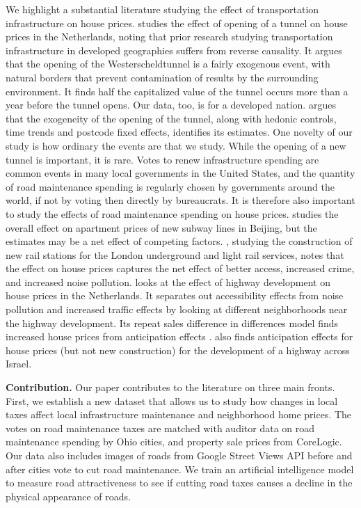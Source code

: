 We highlight a substantial literature studying the effect of transportation infrastructure on house prices. \cite{hoogendoorn2019house} studies the effect of opening of a tunnel on house prices in the Netherlands, noting that prior research studying transportation infrastructure in developed geographies suffers from reverse causality.  It argues that the opening of the Westerscheldtunnel is a fairly exogenous event, with natural borders that prevent contamination of results by the surrounding environment.  It finds half the capitalized value of the tunnel occurs more than a year before the tunnel opens.  Our data, too, is for a developed nation. \cite{hoogendoorn2019house} argues that the exogeneity of the opening of the tunnel, along with hedonic controls, time trends and postcode fixed effects, identifies its estimates.  One novelty of our study is how ordinary the events are that we study.  While the opening of a new tunnel is important, it is rare.  Votes to renew infrastructure spending are common events in many local governments in the United States, and the quantity of road maintenance spending is regularly chosen by governments around the world, if not by voting then directly by bureaucrats.  It is therefore also important to study the effects of road maintenance spending on house prices. \cite{li2016wheels} studies the overall effect on apartment prices of new subway lines in Beijing, but the estimates may be a net effect of competing factors. \cite{gibbons2005valuing}, studying the construction of new rail stations for the London underground and light rail services, notes that the effect on house prices captures the net effect of better access, increased crime, and increased noise pollution. \cite{levkovich2016effects} looks at the effect of highway development on house prices in the Netherlands.  It separates out accessibility effects from noise pollution and increased traffic effects by looking at different neighborhoods near the highway development.  Its repeat sales difference in differences model finds increased house prices from anticipation effects \citep{kohlhase1991impact}. \cite{beenstock2016hedonic} also finds anticipation effects for house prices (but not new construction) for the development of a highway across Israel. 

{\bf Contribution.} Our paper contributes to the literature on three main fronts. First, we establish a new dataset that allows us to study how changes in local taxes affect local infrastructure maintenance and neighborhood home prices.  The votes on road maintenance taxes are matched with auditor data on road maintenance spending by Ohio cities, and property sale prices from CoreLogic. Our data also includes images of roads from Google Street Views API before and after cities vote to cut road maintenance. We train an artificial intelligence model to measure road attractiveness to see if cutting road taxes causes a decline in the physical appearance of roads.  

